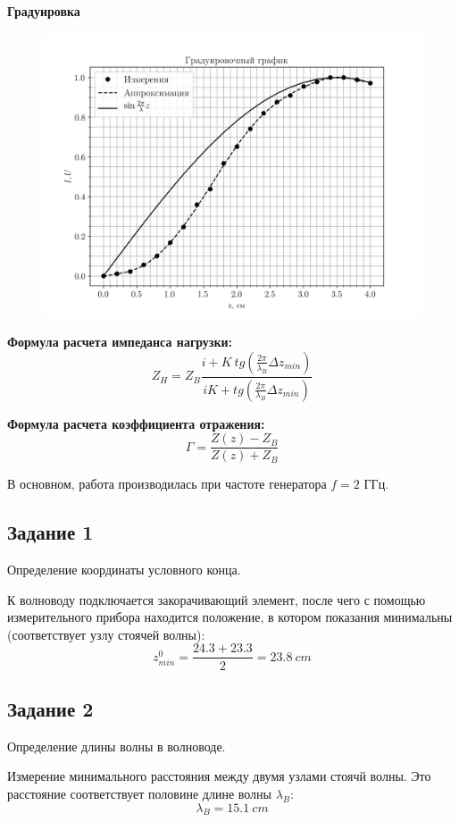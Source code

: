 \textbf{Градуировка}
\begin{figure}[h!]
    \centering
    \includegraphics[width = 0.8\linewidth]{graphs/grad.png}
    \label{fig:2}
    \caption{}
\end{figure}

\textbf{Формула расчета импеданса нагрузки:}
\begin{equation}
    Z_H = Z_B\frac{i+K~tg(\frac{2 \pi }{\lambda_B} \Delta z_{min})}{iK+tg(\frac{2 \pi }{\lambda_B} \Delta z_{min})}
    \label{eq:21}
\end{equation}

\textbf{Формула расчета коэффициента отражения:}
\begin{equation}
    \Gamma = \frac{Z(z)-Z_B}{Z(z)+Z_B}
    \label{eq:22}
\end{equation}

В основном, работа производилась при частоте генератора $f = 2$ ГГц.
\subsection{Задание 1}
Определение координаты условного конца.

К волноводу подключается закорачивающий элемент, после чего с помощью измерительного прибора находится положение, в
котором показания минимальны (соответствует узлу стоячей волны):
$$ z^0_{min} = \frac{24.3+23.3}{2} = 23.8~cm $$

\subsection{Задание 2}
Определение длины волны в волноводе.

Измерение минимального расстояния между двумя узлами стоячй волны. Это расстояние соответствует половине длине волны
$\lambda_B$: $$ \lambda_B  = 15.1~cm $$

